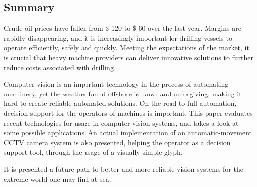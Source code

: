 \subsection*{Summary}
Crude oil prices have fallen from \$ 120 to \$ 60 over the last year. Margins are rapidly disappearing, and it is increasingly important for drilling vessels to operate efficiently, safely and quickly.
Meeting the expectations of the market, it is crucial that heavy machine providers can deliver innovative solutions to further reduce costs associated with drilling.

Computer vision is an important technology in the process of automating machinery, yet the weather found offshore is harsh and unforgiving, making it hard to create reliable automated solutions. On the road to full automation, decision support for the operators of machines is important.
This paper evaluates recent technologies for usage in computer vision systems, and takes a look at some possible applications. An actual implementation of an automatic-movement CCTV camera system is also presented, helping the operator as a decision support tool, through the usage of a visually simple glyph.

It is presented a future path to better and more reliable vision systems for the extreme world one may find at sea.
\newpage